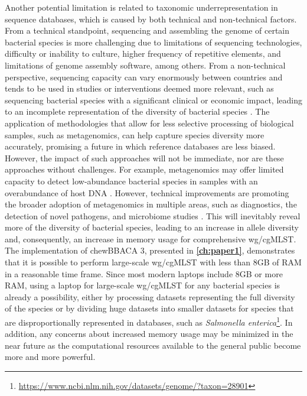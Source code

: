Another potential limitation is related to taxonomic underrepresentation in sequence databases, which is caused by both technical and non-technical factors. From a technical standpoint, sequencing and assembling the genome of certain bacterial species is more challenging due to limitations of sequencing technologies, difficulty or inability to culture, higher frequency of repetitive elements, and limitations of genome assembly software, among others. From a non-technical perspective, sequencing capacity can vary enormously between countries and tends to be used in studies or interventions deemed more relevant, such as sequencing bacterial species with a significant clinical or economic impact, leading to an incomplete representation of the diversity of bacterial species \cite{chorlton_ten_2024}. The application of methodologies that allow for less selective processing of biological samples, such as metagenomics, can help capture species diversity more accurately, promising a future in which reference databases are less biased. However, the impact of such approaches will not be immediate, nor are these approaches without challenges. For example, metagenomics may offer limited capacity to detect low-abundance bacterial species in samples with an overabundance of host \ac{DNA} \cite{mcardle_sensitivity_2020, gao_benchmarking_2025, govender_benchmarking_2022, constantinides_hostile_2023, billington_metagenomics_2022}. However, technical improvements are promoting the broader adoption of metagenomics in multiple areas, such as diagnostics, the detection of novel pathogens, and microbiome studies \cite{buddle_evaluating_2024}. This will inevitably reveal more of the diversity of bacterial species, leading to an increase in allele diversity and, consequently, an increase in memory usage for comprehensive \ac{wg/cgMLST}. The implementation of chewBBACA 3, presented in \textbf{\autoref{ch:paper1}}, demonstrates that it is possible to perform large-scale \ac{wg/cgMLST} with less than 8GB of \ac{RAM} in a reasonable time frame. Since most modern laptops include 8GB or more \ac{RAM}, using a laptop for large-scale \ac{wg/cgMLST} for any bacterial species is already a possibility, either by processing datasets representing the full diversity of the species or by dividing huge datasets into smaller datasets for species that are disproportionally represented in databases, such as \textit{Salmonella enterica}\footnote{\url{https://www.ncbi.nlm.nih.gov/datasets/genome/?taxon=28901}}. In addition, any concerns about increased memory usage may be minimized in the near future as the computational resources available to the general public become more and more powerful.

